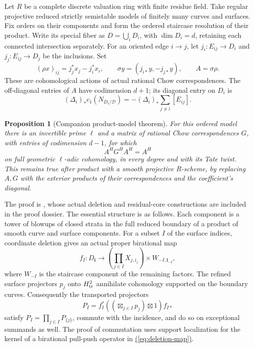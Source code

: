 \documentclass[11pt,a4paper]{article}
\newtheorem{proposition}[theorem]{Proposition}
\theoremstyle{definition}
\theoremstyle{remark}\newtheorem{remark}[theorem]{Remark}
\numberwithin{equation}{section}
\renewcommand{\eqref}[1]{\hyperref[#1]{\textcolor{equationlink}{(\ref*{#1})}}}
\begin{document}
Let $R$ be a complete discrete valuation ring with finite residue field.
Take regular projective reduced strictly semistable models of finitely
many curves and surfaces. Fix orders on their components and form the
ordered staircase resolution of their product. Write its special fiber
as $D=\bigcup_iD_i$, with $\dim D_i=d$, retaining each connected
intersection separately. For an oriented edge $i\to j$, let
$j_i:E_{ij}\to D_i$ and $j_j:E_{ij}\to D_j$ be the inclusions. Set
\[
 (\rho x)_{ij}=j_j^*x_j-j_i^*x_i,\qquad
 \sigma y=(j_{i*}y,-j_{j*}y),\qquad A=\sigma\rho.
\]
These are cohomological actions of actual rational Chow correspondences.
The off-diagonal entries of $A$ have codimension $d+1$; its diagonal
entry on $D_i$ is
\[
 (\Delta_i)_*c_1(N_{D_i/\mathcal D})
       =-(\Delta_i)_*\sum_{j\ne i}[E_{ij}].
\]

\begin{proposition}[Companion product-model theorem]\label{prop:product-model}
For this ordered model there is an invertible prime $\ell$ and a
matrix of rational Chow correspondences $G$, with entries of
codimension $d-1$, for which
\begin{equation}\label{eq:inner-inverse}
 A^H G^H A^H=A^H
\end{equation}
on full geometric $\ell$-adic cohomology, in every degree and with
its Tate twist. This remains true after product with a smooth
projective $R$-scheme, by replacing $A,G$ with the exterior products
of their correspondences and the coefficient's diagonal.
\end{proposition}

The proof is \cite[model splitting theorem]{InternalProducts}, whose
actual deletion and residual-core constructions are included in the
proof dossier. The essential structure is as follows. Each component
is a tower of blowups of closed strata in the full reduced boundary
of a product of smooth curve and surface components. For a subset
$I$ of the surface indices, coordinate deletion gives an actual
proper birational map
\begin{equation}\label{eq:deletion-map}
 f_I:D_{\boldsymbol i}\longrightarrow
 \left(\prod_{j\in I}X_{j,i_j}\right)\times W_{-I,\boldsymbol i_{-I}},
\end{equation}
where $W_{-I}$ is the staircase component of the remaining factors.
The refined surface projectors $p_j$ onto $H^2_{\rm tr}$ annihilate
cohomology supported on the boundary curves. Consequently the transported
projectors
\[
 P_I=f_I^*((\boxtimes_{j\in I}p_j)\boxtimes1)f_{I*}
\]
satisfy $P_I=\prod_{j\in I}P_{\{j\}}$, commute with the incidence,
and do so on exceptional summands as well. The proof of commutation
uses support localization for the kernel of a birational pull-push
operator in \eqref{eq:deletion-map}.
\end{document}
